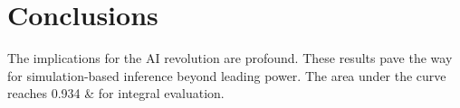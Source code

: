 \section{Conclusions}\label{sec:conclusions}

The implications for the AI revolution are profound. These results pave
the way for simulation-based inference beyond leading power. The area
under the curve reaches 0.934 & for integral evaluation.

